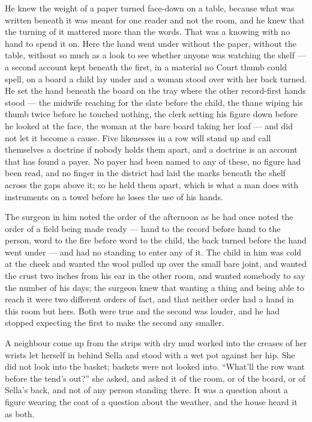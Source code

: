 He knew the weight of a paper turned face-down on a table, because what was written beneath it was meant for one reader and not the room, and he knew that the turning of it mattered more than the words. That was a knowing with no hand to spend it on. Here the hand went under without the paper, without the table, without so much as a look to see whether anyone was watching the shelf --- a second account kept beneath the first, in a material no Court thumb could spell, on a board a child lay under and a woman stood over with her back turned. He set the hand beneath the board on the tray where the other record-first hands stood --- the midwife reaching for the slate before the child, the thane wiping his thumb twice before he touched nothing, the clerk setting his figure down before he looked at the face, the woman at the bare board taking her loaf --- and did not let it become a cause. Five likenesses in a row will stand up and call themselves a doctrine if nobody holds them apart, and a doctrine is an account that has found a payer. No payer had been named to any of these, no figure had been read, and no finger in the district had laid the marks beneath the shelf across the gaps above it; so he held them apart, which is what a man does with instruments on a towel before he loses the use of his hands.

The surgeon in him noted the order of the afternoon as he had once noted the order of a field being made ready --- hand to the record before hand to the person, word to the fire before word to the child, the back turned before the hand went under --- and had no standing to enter any of it. The child in him was cold at the cheek and wanted the wool pulled up over the small bare joint, and wanted the crust two inches from his ear in the other room, and wanted somebody to say the number of his days; the surgeon knew that wanting a thing and being able to reach it were two different orders of fact, and that neither order had a hand in this room but hers. Both were true and the second was louder, and he had stopped expecting the first to make the second any smaller.

\scenebreak

A neighbour come up from the strips with dry mud worked into the creases of her wrists let herself in behind Sella and stood with a wet pot against her hip. She did not look into the basket; baskets were not looked into. “What'll the row want before the tend's out?” she asked, and asked it of the room, or of the board, or of Sella's back, and not of any person standing there. It was a question about a figure wearing the coat of a question about the weather, and the house heard it as both.

